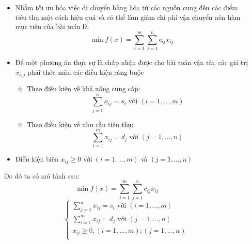 \documentclass{article}
\begin{document}
\begin{itemize}
    \item Nhằm tối ưu hóa việc di chuyển hàng hóa từ các nguồn cung đến các điểm tiêu thụ một cách hiệu quả và có thể làm giảm chi phí vận chuyển nên hàm mục tiêu của bài toán là: 
    \begin{equation*}
        \min{f(x)} = \sum_{i=1}^m \sum_{j=1}^n c_{ij}x_{ij}
    \end{equation*}
    \item Để một phương án thực sự là chấp nhận được cho bài toán vận tải, các giá trị $\displaystyle x_{i,j}$ phải thỏa mãn các điều kiện ràng buộc
    \begin{itemize}
        \item Theo điều kiện về khả năng cung cấp:
        \begin{equation*}
            \sum_{j=1}^n x_{ij} = s_i \text{ với } (i=1,...,m)
        \end{equation*}
        \item Theo điều kiện về nhu cầu tiêu thụ:
        \begin{equation*}
            \sum_{i=1}^m x_{ij} = d_j \text{ với } (j=1,...,n)
        \end{equation*}
    \end{itemize}
    \item Điều kiện biên $x_{ij} \geq 0$ với $(i=1,...,m)$ và $(j=1,...,n)$
\end{itemize}
\hspace{0.4cm} Do đó ta có mô hình sau:
\begin{equation*}
        \min{f(x)} = \sum_{i=1}^m \sum_{j=1}^n c_{ij}x_{ij} \text{ }\text{ }\text{ }\text{ }
\end{equation*}
\begin{equation*}
    \begin{cases}
        \displaystyle \sum_{j=1}^n x_{ij} = s_i \text{ với } (i=1,...,m) \\
        \displaystyle \sum_{i=1}^m x_{ij} = d_j \text{ với } (j=1,...,n) \\
        \displaystyle x_{ij} \geq 0,(i=1,...,m); (j=1,...,n) \\
    \end{cases}
\end{equation*}
\end{document}
